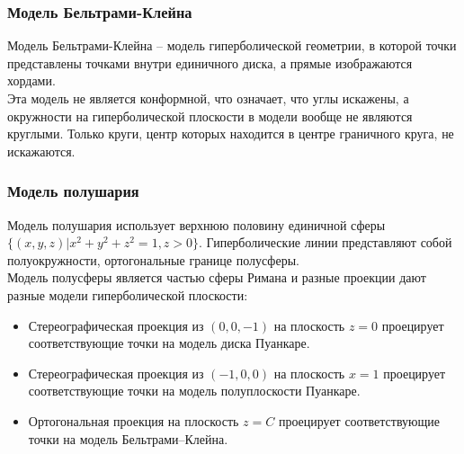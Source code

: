 \documentclass[12pt]{article}
\theoremstyle{definition}
\begin{document}
\subsubsection{Модель Бельтрами-Клейна}
Модель Бельтрами-Клейна -- модель гиперболической геометрии, в которой точки представлены точками внутри единичного диска, а прямые изображаются хордами.\\
Эта модель не является конформной, что означает, что углы искажены, а окружности на гиперболической плоскости в модели вообще не являются круглыми. Только круги, центр которых находится в центре граничного круга, не искажаются.
\subsubsection{Модель полушария}
Модель полушария использует верхнюю половину единичной сферы $\{(x,y,z)|x^2+y^2+z^2=1,z>0\}$. Гиперболические линии представляют собой полуокружности, ортогональные границе полусферы.\\
Модель полусферы является частью сферы Римана и разные проекции дают разные модели гиперболической плоскости:
\begin{itemize}
    \item Стереографическая проекция из $(0,0,-1)$ на плоскость $z=0$ проецирует соответствующие точки на модель диска Пуанкаре.
    \item Стереографическая проекция из $(-1,0,0)$ на плоскость $x=1$ проецирует соответствующие точки на модель полуплоскости Пуанкаре.
    \item Ортогональная проекция на плоскость $z=C$ проецирует соответствующие точки на модель Бельтрами–Клейна.
\end{itemize}
\end{document}

